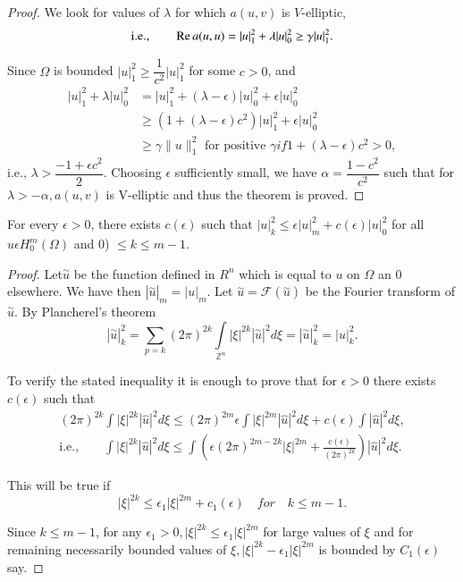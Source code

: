 \begin{proof}%
  We look for values of $\lambda$ for which $a(u, v)$ is $V$-elliptic,
  $$
  \text{i.e.,}\qquad \operatorname{Re} a(u, u) = |u|^2_1 + \lambda |u|^2_0 \ge
  \gamma |u|^2_1.
  $$
  
 Since $\Omega$ is bounded $|u|^2_1 \ge \dfrac{1}{c^2} |u|^2_1$ for
 some $c > 0$, and  
 \begin{align*} 
   |u|^2_1 + \lambda |u|^2_0 & = |u|^2_1 + (\lambda - \epsilon
   )|u|^2_0 +\epsilon |u|^2_0\\ 
   & \ge (1 + (\lambda - \epsilon)c^2) |u|^2_1 + \epsilon |u|^2_0\\
   & \ge \gamma \| u \|^2_1 \text{ for positive } \gamma if 1+ (\lambda -
   \epsilon)c^2 > 0, 
 \end{align*}
 i.e., $\lambda > \dfrac{-1 + \epsilon c^2}{2}$. Choosing $\epsilon$
 sufficiently small, we have  $\alpha= \dfrac {1- c^2}{c^2}$ such
 that for $\lambda > 
 -\alpha, a(u, v)$ is V-elliptic and thus the theorem is proved.  
\end{proof}

\begin{theorem}\label{lec8:sec4:subsec1:thm4.3}%
  For every $\epsilon > 0$, there exists $c(\epsilon)$ such that
  $|u|^2_k \le \epsilon |u|^2_m + c(\epsilon) |u|^2_0$ for all $u
  \epsilon H^m_0(\Omega)$ and 0) $\le k \le m-1$.  
\end{theorem}

\begin{proof}%
  Let\pageoriginale $\overset{\sim}{u}$ be the function defined in $R^n$ which is
  equal to $u$ on $\Omega$ an $0$ elsewhere. We have then
  $|\overset{\sim}{u}|_m = |u|_m$. Let $\overset{\sim}{u} = \mathscr{F}
  (\overset{\sim}{u})$ be the Fourier transform of
  $\overset{\sim}{u}$. By Plancherel's theorem  
  $$
  |\overset{\sim}{u}|^2_k = \sum\limits_{p = k} (2  \pi)^{2k} \int
  \limits_{\mathbb{Z}^n} |\xi|^{2k} |\overset{\sim}{u}|^2 d \xi =
  |\overset{\sim}{u}|^2_k = |u|^2_k. 
  $$
  
  To verify the stated inequality it is enough to prove that for
  $\epsilon > 0$ there exists $c(\epsilon)$ such that 
  \begin{gather*}
    (2\pi)^{2k}\int |\xi|^{2k}|\hat{u}|^2 d \xi \le (2\pi)^{2m}
    \epsilon \int |\xi|^{2m}|\hat{u}|^2 d \xi + c(\epsilon)
    \int |\hat{u}|^2 d \xi, \\
    \text{i.e.,}\qquad \int |\xi|^{2k} |\hat{u}|^2 d \xi \le \int
    (\epsilon(2\pi)^{2m-2k}|\xi|^{2m}+
    \frac{c(\epsilon)}{(2\pi)^{2k}}) |\hat{u}|^2 d\xi.
  \end{gather*}
  
  This will be true if 
  $$
  |\xi|^{2k} \le \epsilon_1 |\xi|^{2m} + c_1 (\epsilon) \quad for
  \quad k \le m-1. 
  $$
  
  Since $k \le m-1$, for any $\epsilon_1 > 0, |\xi|^{2k} \le
  \epsilon_1 |\xi|^{2m}$ for large values of $\xi$ and for remaining
  necessarily bounded values of $\xi, |\xi|^{2k} - \epsilon_1
  |\xi|^{2m}$ is bounded by $C_1 (\epsilon)$ say. 
\end{proof}

